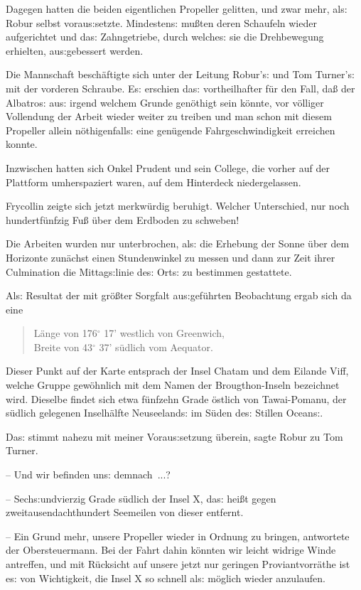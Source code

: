 \documentclass[oneside,12pt]{book}
\newcommand{\s}{s:}
\begin{document}
Dagegen hatten die beiden eigentlichen Propeller gelitten, und zwar
mehr, al{\s} Robur selbst vorau{\s}setzte. Mindesten{\s} mu{\ss}ten
deren Schaufeln wieder aufgerichtet und da{\s} Zahngetriebe, durch
welche{\s} sie die Drehbewegung erhielten, au{\s}gebessert werden.

Die Mannschaft besch\"aftigte sich unter der Leitung Robur'{\s} und
Tom Turner'{\s} mit der vorderen Schraube. E{\s} erschien da{\s}
vortheilhafter f\"ur den Fall, da{\ss} der {\glqq}Albatro{\s}{\grqq}
au{\s} irgend welchem Grunde gen\"othigt sein k\"onnte, vor
v\"olliger Vollendung der Arbeit wieder weiter zu treiben und man
schon mit diesem Propeller allein n\"othigenfall{\s} eine gen\"ugende
Fahrgeschwindigkeit erreichen konnte.

Inzwischen hatten sich Onkel Prudent und sein College, die vorher auf
der Plattform umherspaziert waren, auf dem Hinterdeck niedergelassen.

Frycollin zeigte sich jetzt merkw\"urdig beruhigt. Welcher
Unterschied, nur noch hundertf\"unfzig Fu{\ss} \"uber dem Erdboden zu
schweben!

Die Arbeiten wurden nur unterbrochen, al{\s} die Erhebung der Sonne
\"uber dem Horizonte zun\"achst einen Stundenwinkel zu messen und
dann zur Zeit ihrer Culmination die Mittag{\s}linie de{\s} Ort{\s} zu
bestimmen gestattete.

Al{\s} Resultat der mit gr\"o{\ss}ter Sorgfalt au{\s}gef\"uhrten
Beobachtung ergab sich da eine

\begin{quote}
L\"ange von 176${}^{\circ}$ 17' westlich von Greenwich, \\
Breite von 43${}^{\circ}$ 37' s\"udlich vom Aequator.
\end{quote}

Dieser Punkt auf der Karte entsprach der Insel Chatam und dem Eilande
Viff, welche Gruppe gew\"ohnlich mit dem Namen der Brougthon-Inseln
bezeichnet wird. Dieselbe findet sich etwa f\"unfzehn Grade \"ostlich
von Tawai-Pomanu, der s\"udlich gelegenen Inselh\"alfte
Neuseeland{\s} im S\"uden de{\s} Stillen Ocean{\s}.

{\glqq}Da{\s} stimmt nahezu mit meiner Vorau{\s}setzung \"uberein,
sagte Robur zu Tom Turner.

-- Und wir befinden un{\s} demnach~...?

-- Sech{\s}undvierzig Grade s\"udlich der Insel X, da{\s} hei{\ss}t
gegen zweitausendachthundert Seemeilen von dieser entfernt.

-- Ein Grund mehr, unsere Propeller wieder in Ordnung zu bringen,
antwortete der Obersteuermann. Bei der Fahrt dahin k\"onnten wir
leicht widrige Winde antreffen, und mit R\"ucksicht auf unsere jetzt
nur geringen Proviantvorr\"athe ist e{\s} von Wichtigkeit, die Insel
X so schnell al{\s} m\"oglich wieder anzulaufen.
\end{document}
